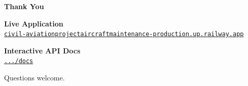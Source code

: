 \documentclass[aspectratio=169]{beamer}
\begin{document}
\begin{frame}[standout]
  \centering
  \Large\textbf{Thank You}

  \vspace{0.8cm}
  \normalsize

  \textbf{Live Application}\\
  \small\href{https://civil-aviationprojectaircraftmaintenance-production.up.railway.app}{\texttt{civil-aviationprojectaircraftmaintenance-production.up.railway.app}}

  \vspace{0.5cm}
  \normalsize
  \textbf{Interactive API Docs}\\
  \small\href{https://civil-aviationprojectaircraftmaintenance-production.up.railway.app/docs}{\texttt{.../docs}}

  \vspace{0.8cm}
  \normalsize
  Questions welcome.
\end{frame}
\end{document}
